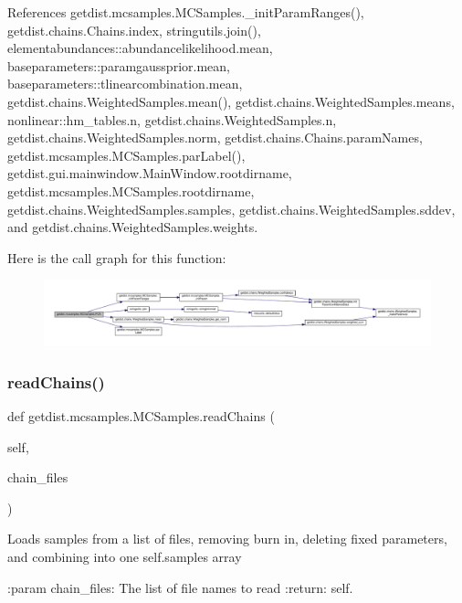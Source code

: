 References getdist.\+mcsamples.\+M\+C\+Samples.\+\_\+init\+Param\+Ranges(), getdist.\+chains.\+Chains.\+index, stringutils.\+join(), elementabundances\+::abundancelikelihood.\+mean, baseparameters\+::paramgaussprior.\+mean, baseparameters\+::tlinearcombination.\+mean, getdist.\+chains.\+Weighted\+Samples.\+mean(), getdist.\+chains.\+Weighted\+Samples.\+means, nonlinear\+::hm\+\_\+tables.\+n, getdist.\+chains.\+Weighted\+Samples.\+n, getdist.\+chains.\+Weighted\+Samples.\+norm, getdist.\+chains.\+Chains.\+param\+Names, getdist.\+mcsamples.\+M\+C\+Samples.\+par\+Label(), getdist.\+gui.\+mainwindow.\+Main\+Window.\+rootdirname, getdist.\+mcsamples.\+M\+C\+Samples.\+rootdirname, getdist.\+chains.\+Weighted\+Samples.\+samples, getdist.\+chains.\+Weighted\+Samples.\+sddev, and getdist.\+chains.\+Weighted\+Samples.\+weights.

Here is the call graph for this function\+:
\nopagebreak
\begin{figure}[H]
\begin{center}
\leavevmode
\includegraphics[width=350pt]{classgetdist_1_1mcsamples_1_1MCSamples_aa70441a6c22c1b03f47f56f08fd67cd1_cgraph}
\end{center}
\end{figure}
\mbox{\label{classgetdist_1_1mcsamples_1_1MCSamples_a4573e1e3c4919d77f2c9552d8e3f6ab0}} 
\subsubsection{\texorpdfstring{read\+Chains()}{readChains()}}
{\footnotesize\ttfamily def getdist.\+mcsamples.\+M\+C\+Samples.\+read\+Chains (\begin{DoxyParamCaption}\item[{}]{self,  }\item[{}]{chain\+\_\+files }\end{DoxyParamCaption})}

\begin{DoxyVerb}Loads samples from a list of files, removing burn in, deleting fixed parameters, and combining into one self.samples array

:param chain_files: The list of file names to read
:return: self.
\end{DoxyVerb}
 

